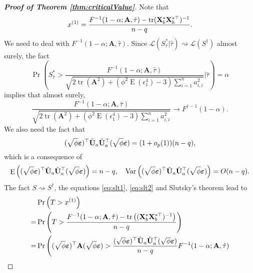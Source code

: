 \documentclass[11pt]{article}
\DeclareMathOperator{\mytr}{tr}
\DeclareMathOperator{\myE}{E}
\DeclareMathOperator{\myVar}{Var}
\newcommand{\BA}{\mathbf{A}}    \newcommand{\BB}{\mathbf{B}}    \newcommand{\BC}{\mathbf{C}}    \newcommand{\BD}{\mathbf{D}}    \newcommand{\BE}{\mathbf{E}}    \newcommand{\BF}{\mathbf{F}}    \newcommand{\BG}{\mathbf{G}}    \newcommand{\BH}{\mathbf{H}}    \newcommand{\BI}{\mathbf{I}}    \newcommand{\BJ}{\mathbf{J}}    \newcommand{\BK}{\mathbf{K}}    \newcommand{\BL}{\mathbf{L}}
\theoremstyle{plain}
\theoremstyle{definition}
\theoremstyle{remark}
\begin{document}
\begin{appendices}
\begin{proof}[\textbf{Proof of Theorem \ref{thm:criticalValue}}]
        Note that 
        \begin{equation*}
            x^{(1)}=
            \frac{F^{-1} (1-\alpha;\BA,\hat \tau)-\mytr(\BX_b^* \BX_b^{*\top})^{-1} }{n-q}.
        \end{equation*}
        We need to deal with $F^{-1} (1-\alpha;\BA,\hat \tau)$.
        Since $\mathcal L (S^*_{\hat \tau}|\hat \tau) \rightsquigarrow \mathcal L(S^\dagger)$ almost surely, the fact 
    \begin{equation*}
        \Pr\left(
            S_{\hat \tau}^*
            >
            \frac{F^{-1} (1-\alpha;\BA,\hat \tau)}{
            \sqrt{
    2 \mytr(\BA^2)
    +
    ( \phi^2 \myE (\epsilon_1^4)-3) \sum_{i=1}^n a_{i,i}^2
            }             
    }
\Bigg | \hat{\tau} \right)=\alpha
    \end{equation*}
    implies that almost surely,
    \begin{equation}\label{eq:slt1}
        \frac{F^{-1} (1-\alpha; \BA,\hat \tau)}{
            \sqrt{
    2 \mytr(\BA^2)
    +
    ( \phi^2 \myE (\epsilon_1^4)-3) \sum_{i=1}^n a_{i,i}^2
            }             
    }
    \to F^{\dagger -1}(1-\alpha).
    \end{equation}
We also need the fact that
\begin{equation}
    (\sqrt \phi \boldsymbol{\varepsilon})^\top 
    \tilde {\mathbf{U}}_a \tilde {\mathbf{U}}_a^\top
(\sqrt \phi \boldsymbol{\varepsilon})
=
(1+o_p(1))(n-q),
    \label{eq:slt2}
\end{equation}
which is a consequence of
\begin{equation*}
    \myE\left(  (\sqrt \phi \bepsilon)^\top 
    \tilde \BU_a \tilde \BU_a^\top
(\sqrt \phi \bepsilon)
\right)
=n-q
,\quad
    \myVar\left(  (\sqrt \phi \bepsilon)^\top 
    \tilde \BU_a \tilde \BU_a^\top
(\sqrt \phi \bepsilon)
\right)
=O(n-q)
    .
\end{equation*}
The fact $S\rightsquigarrow S^\dagger$, the equations \eqref{eq:slt1}, \eqref{eq:slt2} and Slutsky's theorem lead to
\begin{align*}
    &\Pr\left( T > x^{(1)} \right)
            \\
    =
    &\Pr\left( T > \frac{F^{-1} (1-\alpha;\BA,\hat \tau)-\mytr\left( (\BX_b^* \BX_b^{*\top})^{-1}  \right)}{n-q} \right)
            \\
            =&\Pr
            \Bigg( 
                (\sqrt \phi \bepsilon)^\top \BA 
(\sqrt \phi \bepsilon)
            >
            \frac{
            (\sqrt \phi \bepsilon)^\top \tilde \BU_a  \tilde \BU_a^\top (\sqrt \phi \bepsilon)
        }{n-q} F^{-1} (1-\alpha;\BA,{\hat \tau})

\end{align*}
\end{proof}
\end{appendices}
\end{document}
